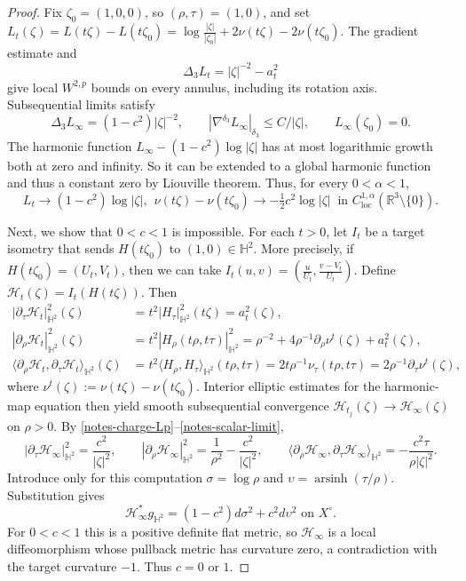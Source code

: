 \documentclass[letterpaper]{amsart}
\theoremstyle{definition}
\theoremstyle{remark}
\begin{document}
\begin{proof}
Fix $\zeta_0=(1,0,0)$, so $(\rho,\tau)=(1,0)$, and set
$L_t(\zeta)=L(t\zeta)-L(t\zeta_0) = \log \frac{|\zeta |}{|\zeta _0|} + 2 \nu (t \zeta ) - 2 \nu (t \zeta _0)$. The gradient estimate and
\[
 \Delta_3L_t=|\zeta|^{-2}-a_t^2
\]
give local $W^{2,p}$ bounds on every annulus, including its rotation axis.
Subsequential limits satisfy
\[
 \Delta_3L_\infty=(1-c^2)|\zeta|^{-2},\qquad
 |\nabla^{\delta_3}L_\infty|_{\delta_3}\le C/|\zeta|,
 \qquad L_\infty(\zeta_0)=0.
\]
The harmonic function $L_\infty-(1-c^2)\log|\zeta|$ has at most logarithmic
growth both at zero and infinity. So it can be extended to a global harmonic function and thus a constant zero by Liouville theorem. Thus, for every $0<\alpha<1$,
\begin{equation}\label{notes-scalar-limit}
 L_t\to (1-c^2)\log|\zeta |,\ \ 
 \nu(t\zeta)-\nu(t\zeta_0)\to -\tfrac12c^2\log|\zeta |
 \ \text{ in }C^{1,\alpha}_{\mathrm{loc}}(\mathbb R^3\setminus\{0\}).
\end{equation}

Next, we show that $0<c<1$ is impossible. For each $t>0$, let $I_t$ be a target isometry that
sends $H(t\zeta_0)$ to $(1,0)\in\mathbb H^2$. More precisely, if $H(t \zeta _0) = (U_t, V_t)$, then we can take $I_t(u,v) = \left( \frac{u}{U_t}, \frac{v- V_t}{U_t} \right) $. Define $\mathcal H_t(\zeta)=I_t(H(t\zeta))$. Then
\begin{align*}
	|\partial_\tau\mathcal H_t|_{\mathbb H^2}^2(\zeta ) &=t^2 |H_{\tau }|^2_{\mathbb{H}^2}(t \zeta ) = a_t^2(\zeta ),\\
	|\partial_\rho\mathcal H_t|_{\mathbb H^2}^2(\zeta ) &= t ^2| H_{\rho }(t \rho , t \tau )|^2_{\mathbb{H}^2}							 =\rho^{-2}+4\rho^{-1}\partial_\rho\nu^t(\zeta)+a_t^2(\zeta ),\\
	\langle \partial _\rho \mathcal{H}_t, \partial _\tau \mathcal{H}_t \rangle_{\mathbb{H}^2}(\zeta ) &= t ^2\langle H_{\rho }, H_{\tau } \rangle_{\mathbb{H}^2}(t \rho , t \tau  )= 2 t \rho ^{-1} \nu _{\tau }(t \rho , t \tau ) = 2 \rho ^{-1} \partial _{\tau } \nu ^{t} (\zeta ),
\end{align*} 
where $\nu ^t (\zeta ) := \nu (t \zeta ) - \nu (t \zeta _0)$.
Interior elliptic estimates
for the harmonic-map equation then yield smooth subsequential convergence $\mathcal{H}_{t_j}(\zeta ) \to \mathcal{H}_\infty(\zeta )$
on $\rho>0$. By \eqref{notes-charge-Lp}--\eqref{notes-scalar-limit},
\[
 |\partial _\tau \mathcal{H}_{\infty}|_{\mathbb H^2}^2=\frac{c^2}{|\zeta|^2},\qquad
 |\partial _\rho \mathcal{H}_{\infty}|_{\mathbb H^2}^2=\frac1{\rho^2}-\frac{c^2}{|\zeta|^2},\qquad
 \langle \partial _\rho \mathcal{H}_{\infty}, \partial _\tau \mathcal{H}_{\infty}\rangle_{\mathbb H^2}
       =-\frac{c^2\tau}{\rho |\zeta|^2}.
\]
Introduce only for this computation $\sigma=\log\rho$ and
$\upsilon=\operatorname{arsinh}(\tau/\rho)$. Substitution gives
\[
 \mathcal{H}_\infty^*g_{\mathbb H^2}=(1-c^2)d\sigma^2+c^2d\upsilon^2 \text{ on } X ^{\circ}.
\]
For $0<c<1$ this is a positive definite flat metric, so $\mathcal{H}_\infty$ is a
local diffeomorphism whose pullback metric has curvature zero, a contradiction with the target curvature $-1$. Thus $c=0$ or $1$.


\end{proof}
\end{document}

